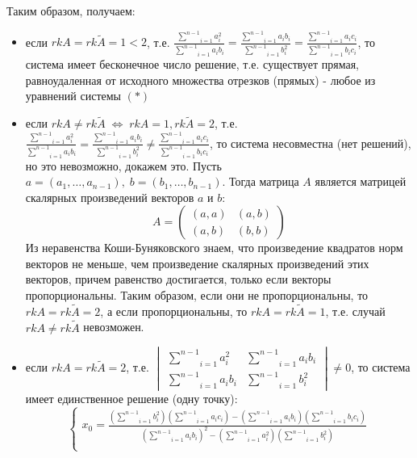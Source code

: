 Таким образом, получаем:
\begin{itemize}
 	\item 
 		если $rk A = rk \tilde{A} = 1 < 2$, т.е. $\frac{\underset{i=1}{\overset{n-1}{\sum}} a_i^2}{\underset{i=1}{\overset{n-1}{\sum}} a_i b_i}=\frac{\underset{i=1}{\overset{n-1}{\sum}} a_i b_i}{\underset{i=1}{\overset{n-1}{\sum}} b_i^2}=\frac{\underset{i=1}{\overset{n-1}{\sum}} a_i c_i}{\underset{i=1}{\overset{n-1}{\sum}} b_i c_i}$, то система имеет бесконечное число решение, т.е. существует прямая, равноудаленная от исходного множества отрезков (прямых) - любое из уравнений системы $(*)$
 	\item 
 		если $rk A \not = rk \tilde{A} \; \Leftrightarrow \; rk A = 1, rk \tilde{A} = 2$, т.е. $\frac{\underset{i=1}{\overset{n-1}{\sum}} a_i^2}{\underset{i=1}{\overset{n-1}{\sum}} a_i b_i}=\frac{\underset{i=1}{\overset{n-1}{\sum}} a_i b_i}{\underset{i=1}{\overset{n-1}{\sum}} b_i^2}\not=\frac{\underset{i=1}{\overset{n-1}{\sum}} a_i c_i}{\underset{i=1}{\overset{n-1}{\sum}} b_i c_i}$, то система несовместна (нет решений), но это невозможно, докажем это.
 		Пусть $a = (a_1, \dots, a_{n-1}), \; b = (b_1, \dots, b_{n-1})$. Тогда матрица $A$ является матрицей скалярных произведений векторов $a$ и $b$:
 		$$A = 
 		\begin{pmatrix}
 			(a,a) & (a,b) \\
 			(a,b) & (b,b)
 		\end{pmatrix}$$
 		Из неравенства Коши-Буняковского знаем, что произведение квадратов норм векторов не меньше, чем произведение скалярных произведений этих векторов, причем равенство достигается, только если векторы пропорциональны. Таким образом, если они не пропорциональны, то $rk A = rk \tilde{A} = 2$, а если пропорциональны, то $rk A = rk \tilde{A} = 1$, т.е. случай $rk A \not = rk \tilde{A}$ невозможен.
 	\item
 		если $rk A = rk \tilde{A} = 2$, т.е. $\begin{vmatrix}
			\underset{i=1}{\overset{n-1}{\sum}} a_i^2 & \underset{i=1}{\overset{n-1}{\sum}} a_i b_i\\
			\underset{i=1}{\overset{n-1}{\sum}} a_i b_i & \underset{i=1}{\overset{n-1}{\sum}} b_i^2
		\end{vmatrix} \not = 0$, то система имеет единственное решение (одну точку):
		$$\begin{cases}
		x_0 = \frac{\left( \underset{i=1}{\overset{n-1}{\sum}} b_i^2 \right) \left( \underset{i=1}{\overset{n-1}{\sum}} a_i c_i \right) - \left( \underset{i=1}{\overset{n-1}{\sum}} a_i b_i \right) \left( \underset{i=1}{\overset{n-1}{\sum}} b_i c_i \right)}{\left( \underset{i=1}{\overset{n-1}{\sum}} a_i b_i \right)^2 - \left( \underset{i=1}{\overset{n-1}{\sum}} a_i^2 \right)\left( \underset{i=1}{\overset{n-1}{\sum}} b_i^2 \right)} \\

\end{cases}$$
\end{itemize}
